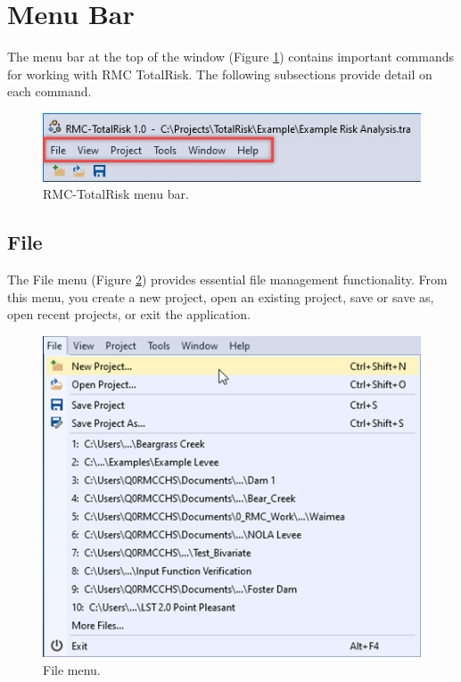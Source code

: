 \documentclass[
]{book}
\begin{document}
\hypertarget{gui-menu-bar}{%
\section{Menu Bar}\label{gui-menu-bar}}

The menu bar at the top of the window (Figure \ref{fig:figure-5}) contains important commands for working with RMC TotalRisk. The following subsections provide detail on each command.

\begin{figure}

{\centering \includegraphics{images/figure5} 

}

\caption{RMC-TotalRisk menu bar.}\label{fig:figure-5}
\end{figure}

\hypertarget{gui-menu-bar-file}{%
\subsection{File}\label{gui-menu-bar-file}}

The File menu (Figure \ref{fig:figure-6}) provides essential file management functionality. From this menu, you create a new project, open an existing project, save or save as, open recent projects, or exit the application.

\begin{figure}

{\centering \includegraphics{images/figure6} 

}

\caption{File menu.}\label{fig:figure-6}
\end{figure}
\end{document}
